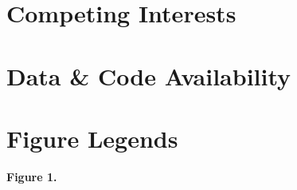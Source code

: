 \documentclass[11pt,a4paper]{article}
\begin{document}
\section*{Competing Interests}

\section*{Data \& Code Availability}

\section*{Figure Legends}

\noindent\textbf{Figure 1.} %
\end{document}
